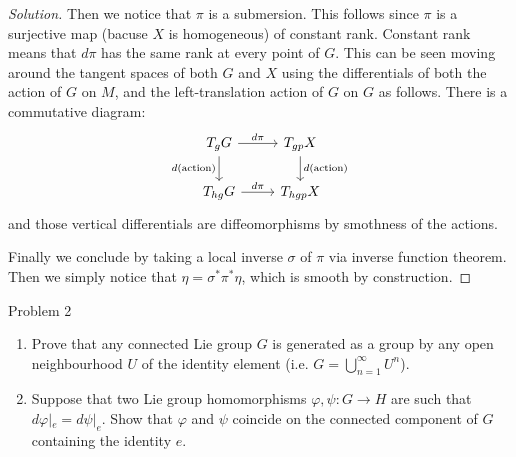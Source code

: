 \begin{proof}[Solution]
Then we notice that $\pi$ is a submersion. This follows since $\pi$ is a surjective map (bacuse $X$ is homogeneous)  of constant rank. Constant rank means that $d\pi$ has the same rank at every point of $G$. This can be seen moving around the tangent spaces of both  $G$ and $X$ using the differentials of both the action of  $G$ on $M$, and the left-translation action of $G$ on $G$ as follows. There is a commutative diagram:
\[\begin{tikzcd}
	T_gG\arrow[r,"d\pi"]\arrow[d,swap,"d(\text{action}) "]&T_{gp}X\arrow[d,"d(\text{action})" ]\\
	T_{hg}G\arrow[r,"d\pi"]&T_{hgp}X
\end{tikzcd}\]
and those vertical differentials are diffeomorphisms by smothness of the actions.

Finally we conclude by taking a local inverse $\sigma$ of $\pi$ via inverse function theorem. Then we simply notice that $\eta=\sigma ^*\pi^*\eta$, which is smooth by construction.
\end{proof}

\begin{thing4}{Problem 2}\leavevmode
	\begin{enumerate}[label=\alph*.]
		\item Prove that any connected Lie group $G$ is generated as a group by any open neighbourhood $U$ of the identity element (i.e. $G=\bigcup_{n=1}^\infty U^n$).
		\item Suppose that two Lie group homomorphisms $\varphi,\psi:G\to H$ are such that $d\varphi|_{e}=d\psi|_{e}$. Show that $\varphi$ and $\psi$ coincide on the connected component of $G$ containing the identity $e$.
	\end{enumerate}
\end{thing4}

